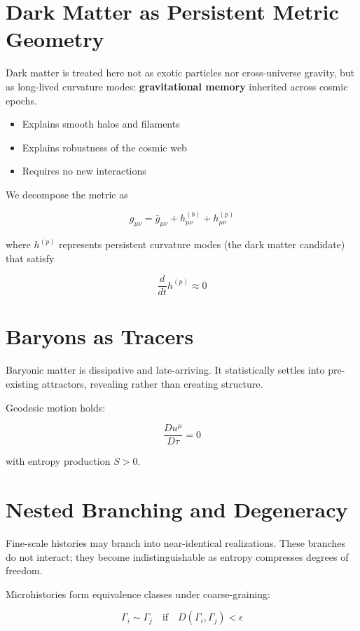 \documentclass[12pt]{article}
\begin{document}
\section{Dark Matter as Persistent Metric Geometry}

Dark matter is treated here not as exotic particles nor cross-universe gravity, but as long-lived curvature modes: \textbf{gravitational memory} inherited across cosmic epochs.

\begin{itemize}
\item Explains smooth halos and filaments
\item Explains robustness of the cosmic web
\item Requires no new interactions
\end{itemize}

We decompose the metric as

\[
g_{\mu\nu} = \bar{g}_{\mu\nu} + h_{\mu\nu}^{(b)} + h_{\mu\nu}^{(p)}
\]

where $h^{(p)}$ represents persistent curvature modes (the dark matter candidate) that satisfy

\[
\frac{d}{dt} h^{(p)} \approx 0
\]

\section{Baryons as Tracers}

Baryonic matter is dissipative and late-arriving. It statistically settles into pre-existing attractors, revealing rather than creating structure.

Geodesic motion holds:

\[
\frac{D u^\mu}{D\tau} = 0
\]

with entropy production $\dot{S} > 0$.

\section{Nested Branching and Degeneracy}

Fine-scale histories may branch into near-identical realizations. These branches do not interact; they become indistinguishable as entropy compresses degrees of freedom.

Microhistories form equivalence classes under coarse-graining:

\[
\Gamma_i \sim \Gamma_j \quad \text{if} \quad D(\Gamma_i,\Gamma_j) < \epsilon
\]
\end{document}
